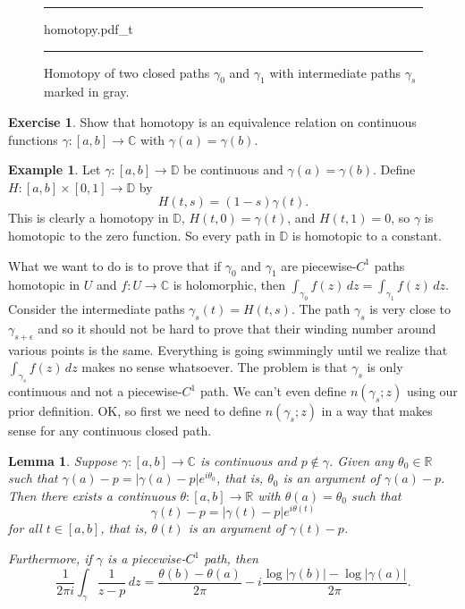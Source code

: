 \documentclass[12pt,openany]{book}
\newcommand{\sabs}[1]{\lvert {#1} \rvert}
\newcommand{\C}{{\mathbb{C}}}
\newcommand{\R}{{\mathbb{R}}}
\newcommand{\D}{{\mathbb{D}}}
\theoremstyle{plain}
\newtheorem{lemma}[thm]{Lemma}
\theoremstyle{remark}
\theoremstyle{definition}
\newenvironment{exbox}{%
    \def\FrameCommand{\vrule width 1pt \relax\hspace{10pt}}%
    \MakeFramed{\advance\hsize-\width\FrameRestore}%
}{%
    \endMakeFramed
}
\newenvironment{myfig}{%
\begin{figure}[h!t]
\noindent\rule{\textwidth}{0.5pt}\vspace{12pt}\par\centering}%
{\par\noindent\rule{\textwidth}{0.5pt}
\end{figure}}
\theoremstyle{exercise}
\newtheorem{exercise}{Exercise}[section]
\theoremstyle{example}
\newtheorem{example}[thm]{Example}
\begin{document}
\begin{myfig}
{homotopy.pdf_t}
\caption{Homotopy of two closed paths $\gamma_0$ and
$\gamma_1$ with intermediate paths $\gamma_s$ marked in gray.\label{fig:homotopy}}
\end{myfig}

\begin{exbox}
\begin{exercise}
Show that homotopy is an equivalence relation on continuous functions
$\gamma \colon [a,b] \to \C$ with $\gamma(a)=\gamma(b)$.
\end{exercise}
\end{exbox}

\begin{example} \label{example:homotopydiscsc}
Let $\gamma \colon [a,b] \to \D$ be continuous and $\gamma(a)=\gamma(b)$.  Define
$H \colon [a,b] \times [0,1] \to \D$ by
\begin{equation*}
H(t,s) = (1-s) \gamma(t) .
\end{equation*}
This is clearly a homotopy in $\D$, $H(t,0) = \gamma(t)$,
and $H(t,1) = 0$, so $\gamma$ is homotopic to the zero function.
So every path in $\D$ is homotopic to a constant.
\end{example}

What we want to do is to prove that if $\gamma_0$ and $\gamma_1$ are
piecewise-$C^1$ paths homotopic in $U$ and $f \colon U \to \C$ is holomorphic, then
$\int_{\gamma_0} f(z)\,dz = \int_{\gamma_1} f(z)\, dz$.
Consider the intermediate paths $\gamma_s(t) = H(t,s)$.
The path $\gamma_s$ is very close to
$\gamma_{s+\epsilon}$ and so it should not be hard to prove that their
winding number around various points is the same.
Everything is going swimmingly until we realize that $\int_{\gamma_s} f(z)
\, dz$ makes no sense whatsoever.  The problem is that $\gamma_s$ is only
continuous and not a piecewise-$C^1$ path.  We can't
even define $n(\gamma_s;z)$ using our prior definition.
OK\@, so first we need to define $n(\gamma_s;z)$ in a way that makes sense for
any continuous closed path.

\begin{lemma} \label{lemma:existenceoftheta}
Suppose $\gamma \colon [a,b] \to \C$ is continuous and $p \notin
\gamma$.  Given any $\theta_0 \in \R$ such that
$\gamma(a)-p = \sabs{\gamma(a)-p} e^{i\theta_0}$, that is,
$\theta_0$ is an argument of $\gamma(a)-p$.
Then there exists a continuous
$\theta \colon [a,b] \to \R$ with $\theta(a) = \theta_0$ such that
\begin{equation*}
\gamma(t)-p = \sabs{\gamma(t)-p} e^{i\theta(t)}
\end{equation*}
for all $t \in [a,b]$, that is, $\theta(t)$ is an argument of $\gamma(t)-p$.

Furthermore, if $\gamma$ is a piecewise-$C^1$ path, then
\begin{equation*}
\frac{1}{2\pi i} \int_\gamma \frac{1}{z-p} \, dz =
\frac{\theta(b)-\theta(a)}{2\pi} 
- i \frac{\log \sabs{\gamma(b)} - \log \sabs{\gamma(a)}}{2\pi} .
\end{equation*}
\end{lemma}
\end{document}

